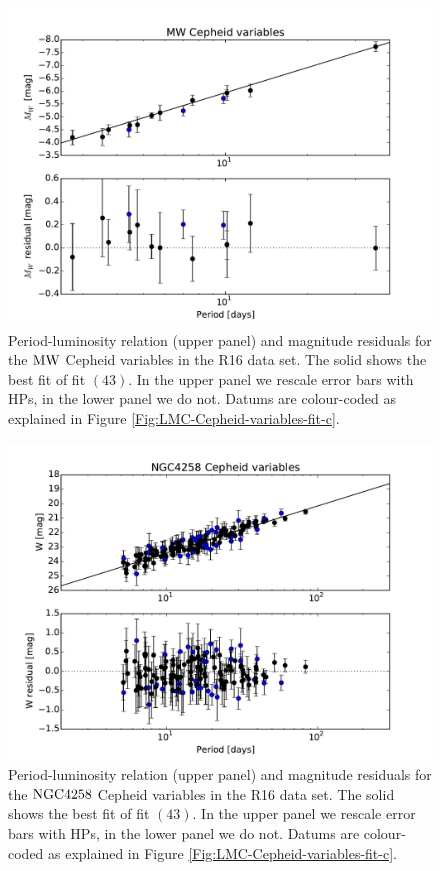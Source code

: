 \begin{figure}[hbtp]
\centering
\includegraphics[width=\textwidth]{figures/chapter-h0/effective_HP_cepheids_MW_r16.pdf}
\caption{Period-luminosity relation (upper panel) and magnitude residuals for the $\mathrm{MW}$ Cepheid variables in the R16 data set. The solid  shows the best fit of fit $(43)$. In the upper panel we rescale error bars with HPs, in the lower panel we do not. Datums are colour-coded as explained in Figure \ref{Fig:LMC-Cepheid-variables-fit-c}.}
\label{Fig:R16-MW}
\end{figure}

\begin{figure}[hbtp]
\centering
\includegraphics[width=\textwidth]{figures/chapter-h0/effective_HP_cepheids_NGC4258_R16.pdf}
\caption{Period-luminosity relation (upper panel) and magnitude residuals for the $\mathrm{NGC4258}$ Cepheid variables in the R16 data set. The solid  shows the best fit of fit $(43)$. In the upper panel we rescale error bars with HPs, in the lower panel we do not. Datums are colour-coded as explained in Figure \ref{Fig:LMC-Cepheid-variables-fit-c}.}
\label{Fig:R16-4258}
\end{figure}

